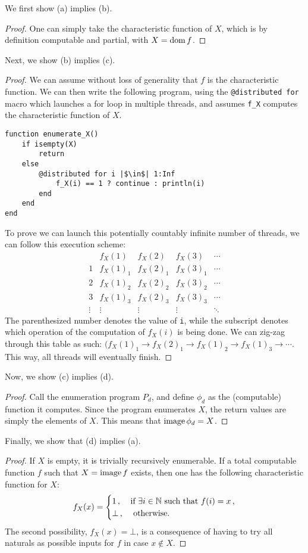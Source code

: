 \begin{solution}
We first show (a) implies (b).
\begin{proof}
	One can simply take the characteristic function of \(X\),
	which is by definition computable and partial,
	with \(X = \operatorname{dom} f\).
\end{proof}

Next, we show (b) implies (c).
\begin{proof}
We can assume without loss of generality
that \(f\) is the characteristic function.
We can then write the following program,
using the \texttt{@distributed for} macro
which launches a for loop in multiple threads,
and assumes \texttt{f_X}
computes the characteristic function of \(X\).
\begin{verbatim}
function enumerate_X()
	if isempty(X)
		return
	else
		@distributed for i |$\in$| 1:Inf
			f_X(i) == 1 ? continue : println(i)
		end
	end
end
\end{verbatim}
To prove we can launch this potentially countably infinite number of threads,
we can follow this execution scheme:
\[
\begin{array}{c|cccc}
	& f_X(1) & f_X(2) & f_X(3) & \cdots \\
	\hline
	1 & f_X(1)_1 & f_X(2)_1 & f_X(3)_1 & \cdots\\
	2 & f_X(1)_2 & f_X(2)_2 & f_X(3)_2 & \cdots\\
	3 & f_X(1)_3 & f_X(2)_3 & f_X(3)_3 & \cdots\\
	\vdots & \vdots & \vdots & \vdots & \ddots
\end{array}
\]
The parenthesized number denotes the value of \texttt{i},
while the subscript denotes which operation of
the computation of \(f_X(i)\) is being done.
We can zig-zag through this table as such:
\((f_X(1)_1 \to f_X(2)_1 \to f_X(1)_2 \to f_X(1)_3 \to \cdots\).
This way, all threads will eventually finish.
\end{proof}

Now, we show (c) implies (d).
\begin{proof}
Call the enumeration program \(P_d\),
and define \(\phi_d\) as the (computable) function it computes.
Since the program enumerates \(X\),
the return values are simply the elements of \(X\).
This means that \(\operatorname{image} \phi_d = X\).
\end{proof}

Finally, we show that (d) implies (a).
\begin{proof}
If \(X\) is empty, it is trivially recursively enumerable.
If a total computable function \(f\) such that \(X = \operatorname{image} f\) exists,
then one has the following characteristic function for \(X\):
\[
f_X(x) = \begin{cases}
1\,, & \textnormal{if } \exists i \in \mathbb{N} \textnormal{ such that } f(i) = x\,,\\
\bot\,, & \textnormal{ otherwise.}
\end{cases}
\]
The second possibility, \(f_X(x) = \bot\),
is a consequence of having to try all naturals as possible inputs for \(f\)
in case \(x \notin X\).
\end{proof}
\end{solution}


